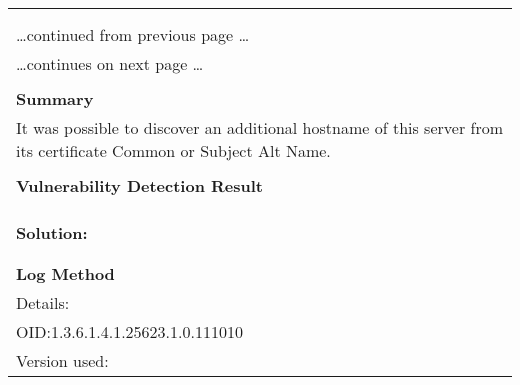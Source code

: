 \documentclass{article}
\begin{document}
\begin{longtable}{|p{}|}
\hline
\rowcolor{gvm_log}{\color{white}{Log (CVSS: 0.0) }}\\
\rowcolor{gvm_log}{\color{white}{NVT: SSL/TLS: Hostname discovery from server certificate}}\\
\hline
\endfirsthead
\hfill\ldots continued from previous page \ldots \\
\hline
\endhead
\hline
\ldots continues on next page \ldots \\
\endfoot
\hline
\endlastfoot
\\
\textbf{Summary}\\
It was possible to discover an additional hostname
  of this server from its certificate Common or Subject Alt Name.\\

        \hline
        \\
\textbf{Vulnerability Detection Result}\\
\rowcolor{white}{\verb=The following additional but not resolvable hostnames were detected:=}\\
\rowcolor{white}{\verb=dreamone=}\\

          \hline
          \\
\textbf{Solution:}\\
\\


        \hline
        \\
\textbf{Log Method}\\
Details:
\rowcolor{white}{\verb=SSL/TLS: Hostname discovery from server certificate=}\\
OID:1.3.6.1.4.1.25623.1.0.111010\\
Version used:
\rowcolor{white}{\verb=2021-11-22T15:32:39Z=}\\
\end{longtable}
\end{document}
